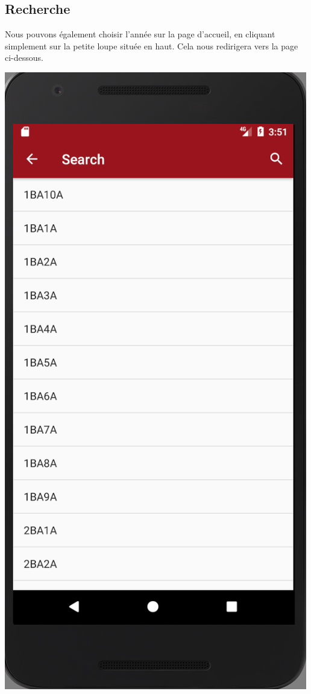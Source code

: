 \documentclass{article}
\begin{document}
	\subsection{Recherche}
	Nous pouvons \'egalement choisir l'ann\'ee sur la page d'accueil, en cliquant simplement sur la petite loupe situ\'ee en haut. Cela nous redirigera vers la page ci-dessous.
        \begin{center}
            \includegraphics[scale=0.4]{img/search.png}
        \end{center}
\end{document}
